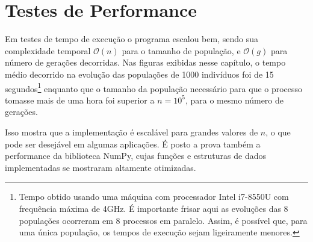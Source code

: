 \section{Testes de Performance}

Em testes de tempo de execução o programa escalou bem, sendo sua complexidade temporal $\mathcal{O}(n)$ para o
tamanho de população, e $\mathcal{O}(g)$ para número de gerações decorridas. 
Nas figuras exibidas nesse capítulo, o tempo médio decorrido na evolução das populações de 1000 indivíduos
foi de 15 segundos\footnote{
  Tempo obtido usando uma máquina com processador Intel i7-8550U com frequência máxima de 4GHz.
  É importante frisar aqui as evoluções das 8 populações ocorreram em 8 processos em paralelo.
  Assim, é possível que, para uma única população, os tempos de execução sejam ligeiramente menores.
} enquanto que o tamanho da população necessário para que o processo tomasse mais de uma hora foi
superior a $n = 10^5$, para o mesmo número de gerações.

Isso mostra que a implementação é escalável para grandes valores de $n$, o que pode ser desejável em
algumas aplicações. É posto a prova também a performance da biblioteca NumPy, cujas funções e estruturas
de dados implementadas se mostraram altamente otimizadas.